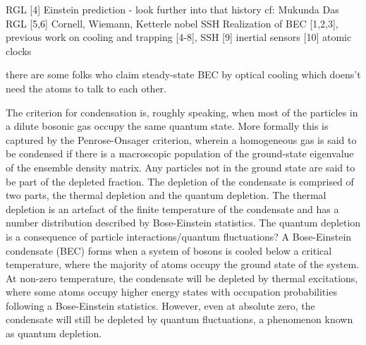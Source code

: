 		RGL [4] Einstein prediction - look further into that history cf: Mukunda Das 
	RGL [5,6] Cornell, Wiemann, Ketterle nobel 
	SSH  Realization of BEC [1,2,3], previous work on cooling and trapping [4-8], 
	SSH [9] inertial sensors [10] atomic clocks 
	
	
	


	there are some folks who claim steady-state BEC by optical cooling which doens't need the atoms to talk to each other.
	
	The criterion for condensation is, roughly speaking, when most of the particles in a dilute bosonic gas occupy the same quantum state.
	More formally this is captured by the Penrose-Onsager criterion, wherein a homogeneous gas is said to be condensed if there is a macroscopic population of the ground-state eigenvalue of the ensemble density matrix.
	Any particles not in the ground state are said to be part of the depleted fraction.
	The depletion of the condensate is comprised of two parts, the thermal depletion and the quantum depletion.
	The thermal depletion is an artefact of the finite temperature of the condensate and has a number distribution described by Bose-Einstein statistics.
	The quantum depletion is a consequence of particle interactions/quantum fluctuations?
	A Bose-Einstein condensate (BEC) forms when a system of bosons is cooled below a critical temperature, where the majority of atoms occupy the ground state of the system.
	At non-zero temperature, the condensate will be depleted by thermal excitations, where some atoms occupy higher energy states with occupation probabilities following a Bose-Einstein statistics.
	However, even at absolute zero, the condensate will still be depleted by quantum fluctuations, a phenomenon known as quantum depletion.
	

